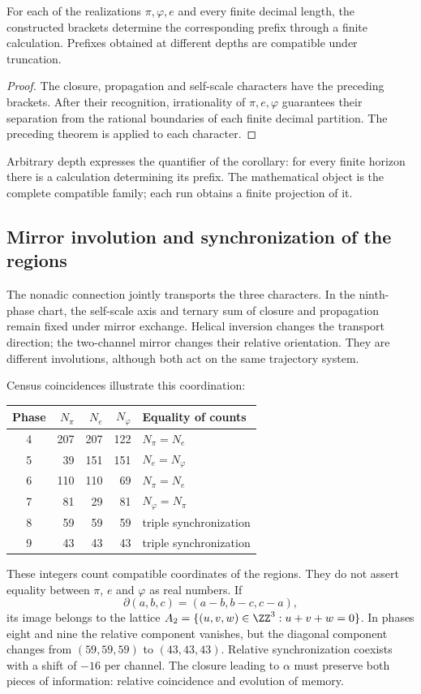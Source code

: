 \begin{corollary}
\label{x_reciprocidad:gen:prefijos-regionales}
For each of the realizations \(\pi,\varphi,e\) and every finite decimal
length, the constructed brackets determine the corresponding prefix
through a finite calculation. Prefixes obtained at different depths
are compatible under truncation.
\end{corollary}
\begin{proof}
The closure, propagation and self-scale characters have the preceding
brackets. After their recognition, irrationality of \(\pi,e,\varphi\)
guarantees their separation from the rational boundaries of each finite decimal
partition. The preceding theorem is applied to each character.
\end{proof}
Arbitrary depth expresses the quantifier of the corollary: for every
finite horizon there is a calculation determining its prefix. The mathematical
object is the complete compatible family; each run obtains a
finite projection of it.

\subsection{Mirror involution and synchronization of the regions}

The nonadic connection jointly transports the three characters. In the ninth-phase chart, the self-scale axis and ternary sum of closure and propagation remain fixed under mirror exchange. Helical inversion changes the transport direction; the two-channel mirror changes their relative orientation. They are different involutions, although both act on the same trajectory system.

Census coincidences illustrate this coordination:
\begin{center}
\begin{tabular}{@{}c rrr l@{}}\toprule
Phase&\(N_\pi\)&\(N_e\)&\(N_\varphi\)&Equality of counts\\\midrule
4&207&207&122&\(N_\pi=N_e\)\\
5&39&151&151&\(N_e=N_\varphi\)\\
6&110&110&69&\(N_\pi=N_e\)\\
7&81&29&81&\(N_\varphi=N_\pi\)\\
8&59&59&59&triple synchronization\\
9&43&43&43&triple synchronization\\\bottomrule
\end{tabular}
\end{center}
These integers count compatible coordinates of the regions. They do not assert equality between \(\pi\), \(e\) and \(\varphi\) as real numbers. If
\[
 \partial(a,b,c)=(a-b,b-c,c-a),
\]
its image belongs to the lattice \(A_2=\{(u,v,w)\in\ZZ^3:u+v+w=0\}\). In phases eight and nine the relative component vanishes, but the diagonal component changes from \((59,59,59)\) to \((43,43,43)\). Relative synchronization coexists with a shift of \(-16\) per channel. The closure leading to \(\alpha\) must preserve both pieces of information: relative coincidence and evolution of memory.

